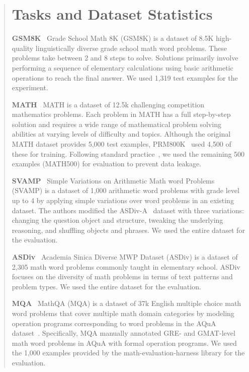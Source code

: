 \documentclass[11pt]{article}
\begin{document}
\begin{abstract}
\section{Tasks and Dataset Statistics}
\label{text:appx:dataset}
\medskip
\par \noindent \textbf{GSM8K}~\citep{cobbe-etal-2021-gsm8k} \; Grade School Math 8K (GSM8K) is a dataset of 8.5K high-quality linguistically diverse grade school math word problems. 
These problems take between 2 and 8 steps to solve. 
Solutions primarily involve performing a sequence of elementary calculations using basic arithmetic operations to reach the final answer. 
We used 1,319 test examples for the experiment.
\medskip
\par \noindent \textbf{MATH}~\citep{hendrycks-etal-2021-math} \; MATH is a dataset of 12.5k challenging competition mathematics problems. 
Each problem in MATH has a full step-by-step solution and requires a wide range of mathematical problem solving abilities at varying levels of difficulty and topics. 
Although the original MATH dataset provides 5,000 test examples, PRM800K~\citep{lightman-etal-2023-prm800k} used 4,500 of these for training. 
Following standard practice~\citep{lightman-etal-2023-prm800k,wang-etal-2024-math}, we used the remaining 500 examples (MATH500) for evaluation to prevent data leakage.
\medskip
\par \noindent \textbf{SVAMP}~\citep{patel-etal-2021-nlp} \; Simple Variations
on Arithmetic Math word Problems (SVAMP) is a dataset of 1,000 arithmetic word problems with grade level up to 4 by applying simple variations over word problems in an existing dataset. 
The authors modified the ASDiv-A~\citep{miao-etal-2020-diverse} dataset with three variations: changing the question object and structure, tweaking the underlying reasoning, and shuffling objects and phrases.
We used the entire dataset for the evaluation.
\medskip
\par \noindent \textbf{ASDiv}~\citep{miao-etal-2020-diverse} \; Academia Sinica Diverse MWP Dataset (ASDiv) is a dataset of 2,305 math word problems commonly taught in elementary school.
ASDiv focuses on the diversity of math problems in terms of text patterns and problem types.
We used the entire dataset for the evaluation.
\medskip
\par \noindent \textbf{MQA}~\citep{amini-etal-2019-mqa} \; MathQA (MQA) is a dataset of 37k English multiple choice math word problems that cover multiple math domain categories by modeling operation programs corresponding to word problems in the AQuA dataset~\citep{ling-etal-2017-program}. 
Specifically, MQA manually annotated GRE- and GMAT-level math word problems in AQuA with formal operation programs.
We used the 1,000 examples provided by the math-evaluation-harness library for the evaluation.


\end{abstract}
\end{document}
